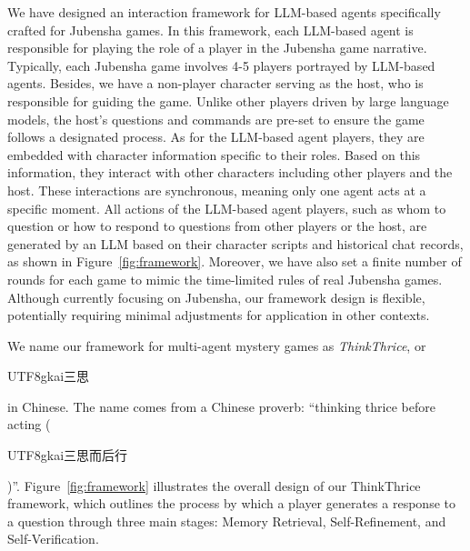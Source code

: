 \documentclass[11pt]{article}
\begin{document}
We have designed an interaction framework for LLM-based agents specifically crafted for Jubensha games. In this framework, each LLM-based agent is responsible for playing the role of a player in the Jubensha game narrative. Typically, each Jubensha game involves 4-5 players portrayed by LLM-based agents. Besides, we have a non-player character serving as the host, who is responsible for guiding the game. Unlike other players driven by large language models, the host's questions and commands are pre-set to ensure the game follows a designated process. As for the LLM-based agent players, they are embedded with character information specific to their roles. Based on this information, they interact with other characters including other players and the host. These interactions are synchronous, meaning only one agent acts at a specific moment. All actions of the LLM-based agent players, such as whom to question or how to respond to questions from other players or the host, are generated by an LLM based on their character scripts and historical chat records, as shown in Figure~\ref{fig:framework}. Moreover, we have also set a finite number of rounds for each game to mimic the time-limited rules of real Jubensha games. Although currently focusing on Jubensha, our framework design is flexible, potentially requiring minimal adjustments for application in other contexts.

We name our framework for multi-agent mystery games as \textit{ThinkThrice}, or \begin{CJK}{UTF8}{gkai}三思\end{CJK} in Chinese. The name comes from a Chinese proverb: ``thinking thrice before acting (\begin{CJK}{UTF8}{gkai}三思而后行\end{CJK})''. Figure~\ref{fig:framework} illustrates the overall design of our ThinkThrice framework, which outlines the process by which a player generates a response to a question through three main stages: Memory Retrieval, Self-Refinement, and Self-Verification.


\end{document}
